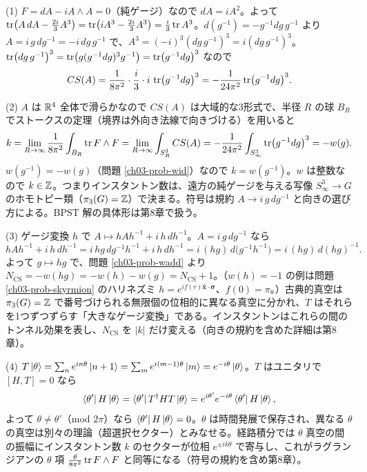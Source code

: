 \begin{solution}
(1) $F=dA-iA\wedge A=0$（純ゲージ）なので $dA=iA^2$。よって $\tr(A\,dA-\frac{2i}{3}A^3)=\tr(iA^3-\frac{2i}3A^3)=\frac i3\tr A^3$。$d(g^{-1})=-g^{-1}dg\,g^{-1}$ より $A=i\,g\,dg^{-1}=-i\,dg\,g^{-1}$ で、$A^3=(-i)^3(dg\,g^{-1})^3=i(dg\,g^{-1})^3$。$\tr(dg\,g^{-1})^3=\tr(g(g^{-1}dg)^3g^{-1})=\tr(g^{-1}dg)^3$ なので
\[
CS(A)=\frac{1}{8\pi^2}\cdot\frac i3\cdot i\,\tr(g^{-1}dg)^3=-\frac{1}{24\pi^2}\tr(g^{-1}dg)^3 .
\]

(2) $A$ は $\mathbb{R}^4$ 全体で滑らかなので $CS(A)$ は大域的な3形式で、半径 $R$ の球 $B_R$ でストークスの定理（境界は外向き法線で向きづける）を用いると
\[
k=\lim_{R\to\infty}\frac{1}{8\pi^2}\int_{B_R}\tr F\wedge F=\lim_{R\to\infty}\int_{S^3_R}CS(A)=-\frac{1}{24\pi^2}\int_{S^3_\infty}\tr(g^{-1}dg)^3=-w(g).
\]
$w(g^{-1})=-w(g)$（問題 \ref{ch03-prob-wid}）なので $k=w(g^{-1})$。$w$ は整数なので $k\in\mathbb{Z}$。つまりインスタントン数は、遠方の純ゲージを与える写像 $S^3_\infty\to G$ のホモトピー類（$\pi_3(G)=\mathbb{Z}$）で決まる。符号は規約 $A\to i\,g\,dg^{-1}$ と向きの選び方による。BPST 解の具体形は第8章で扱う。

(3) ゲージ変換 $h$ で $A\mapsto hAh^{-1}+i\,h\,dh^{-1}$。$A=i\,g\,dg^{-1}$ なら
\[
hAh^{-1}+i\,h\,dh^{-1}=i\,h g\,dg^{-1}h^{-1}+i\,h\,dh^{-1}=i\,(hg)\,d\bigl(g^{-1}h^{-1}\bigr)=i\,(hg)\,d(hg)^{-1}.
\]
よって $g\mapsto hg$ で、問題 \ref{ch03-prob-wadd} より $N_{\mathrm{CS}}=-w(hg)=-w(h)-w(g)=N_{\mathrm{CS}}+1$。（$w(h)=-1$ の例は問題 \ref{ch03-prob-skyrmion} のハリネズミ $h=e^{if(r)\hat{\bm x}\cdot\bm\sigma}$、$f(0)=\pi$。）古典的真空は $\pi_3(G)=\mathbb{Z}$ で番号づけられる無限個の位相的に異なる真空に分かれ、$T$ はそれらを1つずつずらす「大きなゲージ変換」である。インスタントンはこれらの間のトンネル効果を表し、$N_{\mathrm{CS}}$ を $\lvert k\rvert$ だけ変える（向きの規約を含めた詳細は第8章）。

(4) $T\ket\theta=\sum_ne^{in\theta}\ket{n+1}=\sum_me^{i(m-1)\theta}\ket m=e^{-i\theta}\ket\theta$。$T$ はユニタリで $[H,T]=0$ なら
\[
\bra{\theta'}H\ket\theta=\bra{\theta'}T^\dagger HT\ket\theta=e^{i\theta'}e^{-i\theta}\bra{\theta'}H\ket\theta ,
\]
よって $\theta\neq\theta'$（mod $2\pi$）なら $\bra{\theta'}H\ket\theta=0$。$\theta$ は時間発展で保存され、異なる $\theta$ の真空は別々の理論（超選択セクター）とみなせる。経路積分では $\theta$ 真空の間の振幅にインスタントン数 $k$ のセクターが位相 $e^{\pm ik\theta}$ で寄与し、これがラグランジアンの $\theta$ 項 $\frac{\theta}{8\pi^2}\tr F\wedge F$ と同等になる（符号の規約を含め第8章）。
\end{solution}

